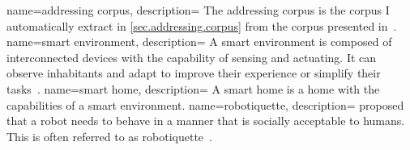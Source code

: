 {
	name={addressing corpus},
	description={
		The \gls{addressing corpus} is the corpus I automatically extract in \cref{sec.addressing.corpus} from the corpus presented in~\cite{Holthaus2016a}.
		}
}
{
	name={smart environment},
	description={
		A \gls{smart environment} is composed of interconnected \glspl{device} with the capability of sensing and actuating.
		It can observe inhabitants and adapt to improve their experience or simplify their tasks~\cite{Cook2005}.
		}
}
{
	name={smart home},
	description={
		A \gls{smart home} is a home with the capabilities of a \gls{smart environment}.
		}
}
{
	name={robotiquette},
	description={
		 proposed that a \gls{robot} needs to behave in a manner that is socially acceptable to humans.
		This is often referred to as \gls{robotiquette}~\cite{dautenhahn2007socially}. 
		}
}
